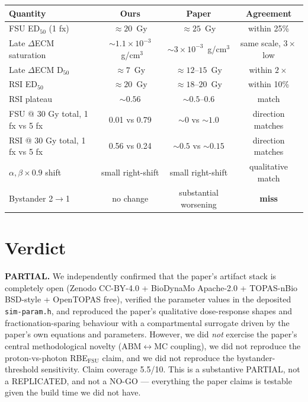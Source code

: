 \documentclass[11pt]{article}
\begin{document}
\begin{center}
\begin{tabular}{lccc}
\toprule
Quantity & Ours & Paper & Agreement \\
\midrule
FSU ED$_{50}$ (1 fx)              & $\approx 20$~Gy       & $\approx 25$~Gy         & within 25\% \\
Late $\Delta$ECM saturation       & $\sim 1.1\times 10^{-3}$~g/cm$^3$ & $\sim 3\times 10^{-3}$~g/cm$^3$ & same scale, $3\times$ low \\
Late $\Delta$ECM D$_{50}$         & $\approx 7$~Gy        & $\approx 12$--$15$~Gy   & within $2\times$ \\
RSI ED$_{50}$                     & $\approx 20$~Gy       & $\approx 18$--$20$~Gy   & within 10\% \\
RSI plateau                       & $\sim 0.56$           & $\sim 0.5$--$0.6$       & match \\
FSU @ 30 Gy total, 1 fx vs 5 fx   & 0.01 vs 0.79          & $\sim 0$ vs $\sim 1.0$  & direction matches \\
RSI @ 30 Gy total, 1 fx vs 5 fx   & 0.56 vs 0.24          & $\sim 0.5$ vs $\sim 0.15$ & direction matches \\
$\alpha,\beta \times 0.9$ shift   & small right-shift     & small right-shift       & qualitative match \\
Bystander 2$\rightarrow$1         & no change             & substantial worsening   & \textbf{miss} \\
\bottomrule
\end{tabular}
\end{center}

\section{Verdict}

\textbf{PARTIAL.} We independently confirmed that the paper's artifact
stack is completely open (Zenodo CC-BY-4.0 + BioDynaMo Apache-2.0 +
TOPAS-nBio BSD-style + OpenTOPAS free), verified the parameter values
in the deposited \texttt{sim-param.h}, and reproduced the paper's
qualitative dose-response shapes and fractionation-sparing behaviour
with a compartmental surrogate driven by the paper's own equations and
parameters. However, we did \emph{not} exercise the paper's central
methodological novelty (ABM$\leftrightarrow$MC coupling), we did not
reproduce the proton-vs-photon RBE$_{\mathrm{FSU}}$ claim, and we did
not reproduce the bystander-threshold sensitivity. Claim coverage
5.5/10. This is a substantive PARTIAL, not a REPLICATED, and not a
NO-GO --- everything the paper claims is testable given the build time
we did not have.


\end{document}
